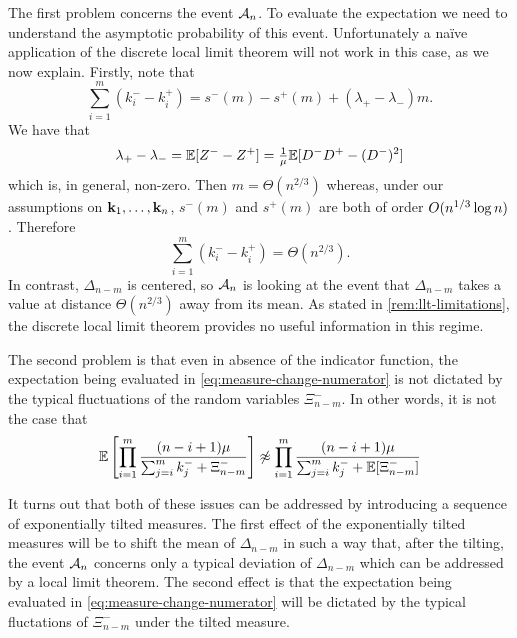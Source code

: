 The first problem concerns the event $\mathcal A_n$. To evaluate the expectation we need to understand the asymptotic probability of this event. Unfortunately a naïve application of the discrete local limit theorem will not work in this case, as we now explain. Firstly, note that
\begin{equation*}
    \sum_{i=1}^m (k_i^- - k_i^+) = s^-(m) - s^+(m) + (\lambda_+ - \lambda_-) m.
\end{equation*}
We have that
\begin{equation*}
    \lambda_+ - \lambda_- = {\mathbb E}[Z^- - Z^+] = \tfrac{1}{\mu} {\mathbb E}[D^-D^+ - (D^-)^2]
\end{equation*}
which is, in general, non-zero. Then $m = \Theta(n^{2/3})$ whereas, under our assumptions on ${\mathbf k}_1, \ldots, {\mathbf k}_n$, $s^{-}(m)$ and $s^+(m)$ are both of order $O(n^{1/3} \log n)$. Therefore
\begin{equation*}
    \sum_{i=1}^m (k_i^- - k_i^+) = \Theta(n^{2/3}).
\end{equation*}
In contrast, $\Delta_{n-m}$ is centered, so $\mathcal A_n$ is looking at the event that $\Delta_{n-m}$ takes a value at distance $\Theta(n^{2/3})$ away from its mean. As stated in \cref{rem:llt-limitations}, the discrete local limit theorem provides no useful information in this regime. 

The second problem is that even in absence of the indicator function, the expectation being evaluated in \cref{eq:measure-change-numerator} is not dictated by the typical fluctuations of the random variables $\Xi^-_{n-m}$. In other words, it is not the case that
\begin{equation}
    {\mathbb E}\left[ 
        \prod_{i=1}^m \frac{(n - i + 1) \mu}{\sum_{j=i}^m k_j^- + \Xi_{n-m}^-}
    \right]
    \not \approx
    \prod_{i=1}^m \frac{(n - i + 1) \mu}{\sum_{j=i}^m k_j^- + {\mathbb E}[\Xi_{n-m}^-]}
\end{equation}

It turns out that both of these issues can be addressed by introducing a sequence of exponentially tilted measures.  The first effect of the exponentially tilted measures will be to shift the mean of $\Delta_{n-m}$ in such a way that, after the tilting, the event $\mathcal A_n$ concerns only a typical deviation of $\Delta_{n-m}$ which can be addressed by a local limit theorem. The second effect is that the expectation being evaluated in \cref{eq:measure-change-numerator} will be dictated by the typical fluctations of $\Xi^-_{n-m}$ under the tilted measure. 

